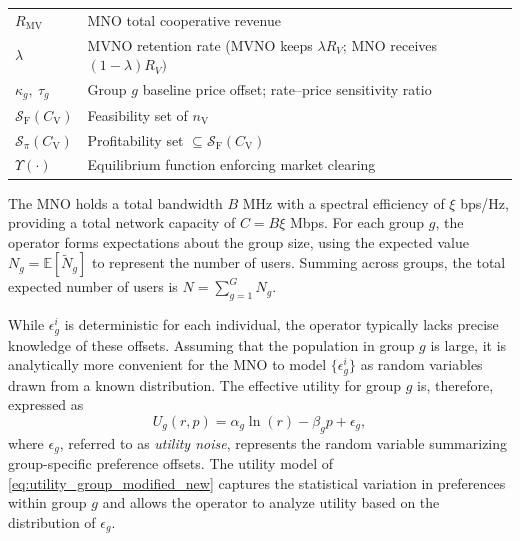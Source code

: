 \documentclass[12pt, draftclsnofoot, onecolumn]{IEEEtran}
\begin{document}
\begin{table}[t]
\begin{tabularx}{0.98\linewidth}{|l|X|}
			$R_{\mathrm{MV}}$ & MNO total cooperative revenue  \\
			$\lambda$ & MVNO retention rate (MVNO keeps $\lambda R_V$; MNO receives $(1-\lambda)R_V)$ \\
			$\kappa_g,\ \tau_g$ & Group $g$ baseline price offset; rate–price sensitivity ratio \\
			$\mathcal S_{\mathrm F}(C_{\mathrm V})$ & Feasibility set of $n_{\mathrm V}$ \\
			$\mathcal S_{\pi}(C_{\mathrm V})$ & Profitability set $\subseteq\mathcal S_{\mathrm F}(C_{\mathrm V})$ \\
			$\Upsilon(\cdot)$ & Equilibrium function enforcing market clearing \\
			\hline
		\end{tabularx}
	\end{table}
	
	
	
	
	

	
	The MNO holds a total bandwidth \(B\) MHz with a spectral efficiency of \(\xi\) bps/Hz, providing a total network capacity of \(C = B \xi\) Mbps. For each group \(g\), the operator forms expectations about the group size, using the expected value \(N_g = \mathbb{E}[\tilde{N}_g]\) to represent the number of users. Summing across groups, the total expected number of users is \(N = \sum_{g=1}^G N_g\).
	
	While \(\epsilon_{g}^i\) is deterministic for each individual, the operator typically lacks precise knowledge of these offsets. Assuming that the population in group \(g\) is large, it is analytically more convenient for the MNO to model \(\{\epsilon_{g}^i\}\) as random variables drawn from a known distribution.  The effective utility for group \(g\) is, therefore, expressed as 
	\begin{equation}
		U_g(r, p) = \alpha_g \ln(r) - \beta_g p + \epsilon_g,
		\label{eq:utility_group_modified_new}
	\end{equation}
	where \(\epsilon_g\), referred to as \emph{utility noise}, represents the random variable summarizing group-specific preference offsets. The utility model of \eqref{eq:utility_group_modified_new} captures the statistical variation in preferences within group \(g\) and allows the operator to analyze utility based on the distribution of \(\epsilon_g\). 
	
\end{document}
